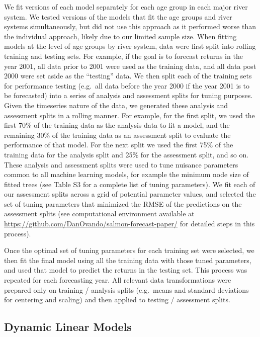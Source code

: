 \documentclass[
]{article}
\begin{document}
We fit versions of each model separately for each age group in each major river system. We tested versions of the models that fit the age groups and river systems simultaneously, but did not use this approach as it performed worse than the individual approach, likely due to our limited sample size. When fitting models at the level of age groups by river system, data were first split into rolling training and testing sets. For example, if the goal is to forecast returns in the year 2001, all data prior to 2001 were used as the training data, and all data post 2000 were set aside as the ``testing'' data. We then split each of the training sets for performance testing (e.g.~all data before the year 2000 if the year 2001 is to be forecasted) into a series of analysis and assessment splits for tuning purposes. Given the timeseries nature of the data, we generated these analysis and assessment splits in a rolling manner. For example, for the first split, we used the first 70\% of the training data as the analysis data to fit a model, and the remaining 30\% of the training data as an assessment split to evaluate the performance of that model. For the next split we used the first 75\% of the training data for the analysis split and 25\% for the assessment split, and so on. These analysis and assessment splits were used to tune nuisance parameters common to all machine learning models, for example the minimum node size of fitted trees (see Table S3 for a complete list of tuning parameters). We fit each of our assessment splits across a grid of potential parameter values, and selected the set of tuning parameters that minimized the RMSE of the predictions on the assessment splits (see computational environment available at \url{https://github.com/DanOvando/salmon-forecast-paper/} for detailed steps in this process).

Once the optimal set of tuning parameters for each training set were selected, we then fit the final model using all the training data with those tuned parameters, and used that model to predict the returns in the testing set. This process was repeated for each forecasting year. All relevant data transformations were prepared only on training / analysis splits (e.g.~means and standard deviations for centering and scaling) and then applied to testing / assessment splits.

\hypertarget{dynamic-linear-models}{%
\subsection{Dynamic Linear Models}\label{dynamic-linear-models}}
\end{document}

